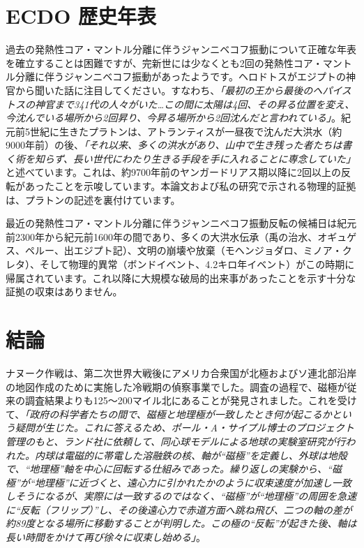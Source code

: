 \documentclass[10pt,twocolumn,letterpaper]{article}
\begin{document}
\section{ECDO 歴史年表}

過去の発熱性コア・マントル分離に伴うジャンニベコフ振動について正確な年表を確立することは困難ですが、完新世には少なくとも2回の発熱性コア・マントル分離に伴うジャンニベコフ振動があったようです。ヘロドトスがエジプトの神官から聞いた話に注目してください。すなわち、\textit{「最初の王から最後のヘパイストスの神官まで341代の人々がいた…この間に太陽は4回、その昇る位置を変え、今沈んでいる場所から2回昇り、今昇る場所から2回沈んだと言われている」}\cite{32}。紀元前5世紀に生きたプラトン\cite{111}は、アトランティスが一昼夜で沈んだ大洪水（約9000年前）の後、\textit{「それ以来、多くの洪水があり、山中で生き残った者たちは書く術を知らず、長い世代にわたり生きる手段を手に入れることに専念していた」}\cite{112}と述べています。これは、約9700年前のヤンガードリアス期以降に2回以上の反転があったことを示唆しています。本論文および私の研究\cite{2}で示される物理的証拠は、プラトンの記述を裏付けています。

最近の発熱性コア・マントル分離に伴うジャンニベコフ振動反転の候補日は紀元前2300年から紀元前1600年の間であり、多くの大洪水伝承（禹の治水\cite{113,114,115}、オギュゲス\cite{116,117}、ペルー\cite{118,119}、出エジプト記\cite{120}）、文明の崩壊や放棄（モヘンジョダロ\cite{121}、ミノア・クレタ\cite{100,101}）、そして物理的異常（ボンドイベント\cite{122}、4.2キロ年イベント\cite{90}）がこの時期に帰属されています。これ以降に大規模な破局的出来事があったことを示す十分な証拠の収束はありません。

\section{結論}

ナヌーク作戦は、第二次世界大戦後にアメリカ合衆国が北極およびソ連北部沿岸の地図作成のために実施した冷戦期の偵察事業でした\cite{137}。調査の過程で、磁極が従来の調査結果よりも125〜200マイル北にあることが発見されました。これを受けて、\textit{「政府の科学者たちの間で、磁極と地理極が一致したとき何が起こるかという疑問が生じた。これに答えるため、ポール・A・サイプル博士のプロジェクト管理のもと、ランド社に依頼して、同心球モデルによる地球の実験室研究が行われた。内球は電磁的に帯電した溶融鉄の核、軸が“磁極”を定義し、外球は地殻で、“地理極”軸を中心に回転する仕組みであった。繰り返しの実験から、“磁極”が“地理極”に近づくと、遠心力に引かれたかのように収束速度が加速し一致しそうになるが、実際には一致するのではなく、“磁極”が“地理極”の周囲を急速に“反転（フリップ）”し、その後遠心力で赤道方面へ跳ね飛び、二つの軸の差が約89度となる場所に移動することが判明した。この極の“反転”が起きた後、軸は長い時間をかけて再び徐々に収束し始める」}\cite{138,139}。
\end{document}

